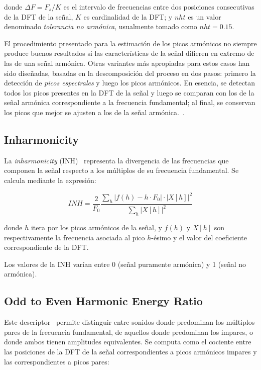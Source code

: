 \noindent
donde $\Delta F = F_{s}/K$ es el intervalo de frecuencias entre dos posiciones consecutivas de la DFT de la señal, $K$ es cardinalidad de la DFT;
y $nht$ es un valor denominado \textit{tolerancia no armónica}, usualmente tomado como $nht = 0.15$.

El procedimiento presentado para la estimación de los picos armónicos no siempre produce buenos resultados si las características de la señal difieren en extremo de las de una señal armónica.
Otras variantes más apropiadas para estos casos han sido diseñadas, basadas en la descomposición del proceso en dos pasos: primero la detección de \textit{picos espectrales} y luego los picos armónicos.
En esencia, se detectan todos los picos presentes en la DFT de la señal y luego se comparan con los de la señal armónica correspondiente a la frecuencia fundamental;
al final, se conservan los picos que mejor se ajusten a los de la señal armónica.~\cite{Kim05}.

\subsection{Inharmonicity}\label{subsec:inharmonicity}

La \textit{inharmonicity} (INH)~\cite{Peters04,Zamanian17} representa la divergencia de las frecuencias que componen la señal respecto a los múltiplos de su frecuencia fundamental.
Se calcula mediante la expresión:

\begin{equation}
    \label{eq:INH}
    INH = \frac{2}{F_0} \frac{\sum_{h}{|f(h) - h\cdot F_0|\cdot |X[h]|^2}}{\sum_{h}{|X[h]|^2}}
\end{equation}

\noindent
donde $h$ itera por los picos armónicos de la señal, y $f(h)$ y $X[h]$ son respectivamente la frecuencia asociada al pico $h$-ésimo y el valor del coeficiente correspondiente de la DFT\@.

Los valores de la INH varían entre 0 (señal puramente armónica) y 1 (señal no armónica).

\subsection{Odd to Even Harmonic Energy Ratio}\label{subsec:oddToEvenHarmonicEnergyRatio}

Este descriptor~\cite{Gunasekaran11,Peters04} permite distinguir entre sonidos donde predominan los múltiplos pares de la frecuencia fundamental, de aquellos donde predominan los impares, o donde ambos tienen amplitudes equivalentes.
Se computa como el cociente entre las posiciones de la DFT de la señal correspondientes a picos armónicos impares y las correspondientes a picos pares:

